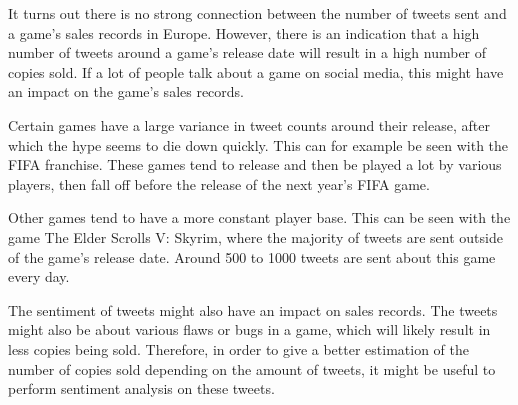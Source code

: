 It turns out there is no strong connection between the number of tweets sent and a game's sales records in Europe. However, there is an indication that a high number of tweets around a game's release date will result in a high number of copies sold. If a lot of people talk about a game on social media, this might have an impact on the game's sales records.  

Certain games have a large variance in tweet counts around their release, after which the hype seems to die down quickly. This can for example be seen with the FIFA franchise. These games tend to release and then be played a lot by various players, then fall off before the release of the next year's FIFA game. 

Other games tend to have a more constant player base. This can be seen with the game The Elder Scrolls V: Skyrim, where the majority of tweets are sent outside of the game's release date. Around 500 to 1000 tweets are sent about this game every day.

The sentiment of tweets might also have an impact on sales records. The tweets might also be about various flaws or bugs in a game, which will likely result in less copies being sold. Therefore, in order to give a better estimation of the number of copies sold depending on the amount of tweets, it might be useful to perform sentiment analysis on these tweets.